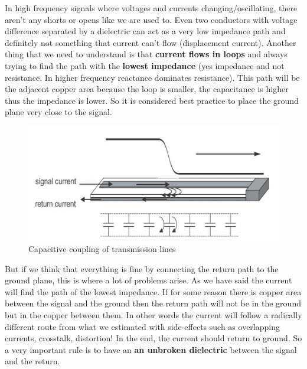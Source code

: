 \documentclass[final]{cubedoc}
\begin{document}
	
	In high frequency signals where voltages and currents changing/oscillating, there aren't any shorts or opens like we are used to. Even two conductors with voltage difference separated by a dielectric can act as a very low impedance path and definitely not something that current can't flow (displacement current). Another thing that we need to understand is that \textbf{current flows in loops} and always trying to find the path with the \textbf{lowest impedance} (yes impedance and not resistance. In higher frequency reactance dominates resistance).
	This path will be the adjacent copper area because the loop is smaller, the capacitance is higher thus the impedance is lower. So it is considered best practice to place the ground plane very close to the signal.
	
	\begin{figure}[h!]
		\centering
		\includegraphics[keepaspectratio, width=\textwidth, height=.2\textheight]{assets/signal_return.png}
		\caption{Capacitive coupling of transmission lines \cite{bogatin2009signal}}
	\end{figure}
	
	But if we think that everything is fine by connecting the return path to the ground plane, this is where a lot of problems arise. As we have said the current will find the path of the lowest impedance. If for some reason there is copper area between the signal and the ground then the return path will not be in the ground but in the copper between them. In other words the current will follow a radically different route from what we estimated with side-effects such as overlapping currents, crosstalk, distortion! In the end, the current should return to ground. So a very important rule is to have an \textbf{an unbroken dielectric} between the signal and the return. 
	
\end{document}
